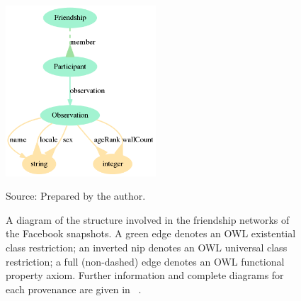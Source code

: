 \begin{figure}[!ht]
\centering
\caption{A diagram of the structure involved in the friendship networks
of the Facebook snapshots.
A green edge denotes an OWL existential class restriction;
an inverted nip denotes an OWL universal class restriction;
a full (non-dashed) edge denotes an OWL functional property axiom.
Further information and complete diagrams for each provenance are given in ~\cite{losd}.}\label{dia}
\includegraphics[width=0.5\textwidth]{ontologies/facebook-legacy-AntonioAnzoategui18022013Friendship.ttl/draw}
\begin{flushleft}
Source: Prepared by the author.\
\end{flushleft}
\end{figure}


